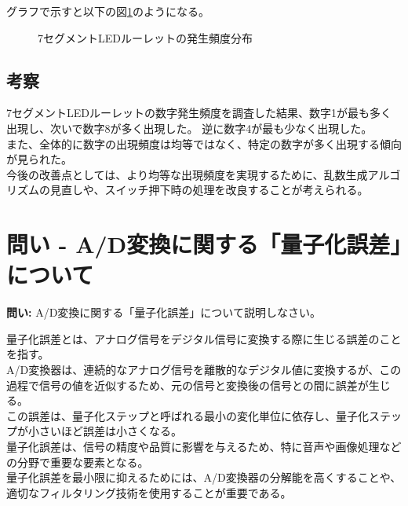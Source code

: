 \documentclass[a4paper,11pt,dvipdfmx]{jsarticle}
\begin{document}
グラフで示すと以下の図\ref{graph}のようになる。
\begin{figure}[h]
\centering
{}
\caption{7セグメントLEDルーレットの発生頻度分布}
\label{graph}
\end{figure}

\subsection{考察}
7セグメントLEDルーレットの数字発生頻度を調査した結果、数字1が最も多く出現し、次いで数字8が多く出現した。
逆に数字4が最も少なく出現した。\\
また、全体的に数字の出現頻度は均等ではなく、特定の数字が多く出現する傾向が見られた。\\
今後の改善点としては、より均等な出現頻度を実現するために、乱数生成アルゴリズムの見直しや、スイッチ押下時の処理を改良することが考えられる。


\section{問い - A/D変換に関する「量子化誤差」について}
\begin{shaded}
    \noindent
    \textbf{問い:} A/D変換に関する「量子化誤差」について説明しなさい。
\end{shaded}
量子化誤差とは、アナログ信号をデジタル信号に変換する際に生じる誤差のことを指す。\\
A/D変換器は、連続的なアナログ信号を離散的なデジタル値に変換するが、この過程で信号の値を近似するため、元の信号と変換後の信号との間に誤差が生じる。\\
この誤差は、量子化ステップと呼ばれる最小の変化単位に依存し、量子化ステップが小さいほど誤差は小さくなる。\\
量子化誤差は、信号の精度や品質に影響を与えるため、特に音声や画像処理などの分野で重要な要素となる。\\
量子化誤差を最小限に抑えるためには、A/D変換器の分解能を高くすることや、適切なフィルタリング技術を使用することが重要である。\\
    


\end{document}
